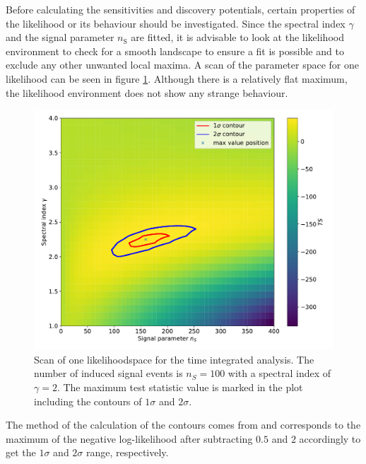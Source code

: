 Before calculating the sensitivities and discovery potentials, certain properties of the likelihood or its behaviour should be investigated.
Since the spectral index $\gamma$ and the signal parameter $n_\text{S}$ are fitted, it is advisable to look at the likelihood environment to check for a smooth landscape to ensure a fit is possible and to exclude any other unwanted local maxima.
A scan of the parameter space for one likelihood can be seen in figure \ref{fig:llh_scan_time_int}.
Although there is a relatively flat maximum, the likelihood environment does not show any strange behaviour.
\begin{figure}
    \centering
    \includegraphics[width=\linewidth]{Plots/05_csky/llh_scan_time_int.pdf}
    \caption{Scan of one likelihoodspace for the time integrated analysis. The number of induced signal events is $n_S = \num{100}$ with a spectral index of $\gamma = 2$. The maximum test statistic value is marked in the plot including the contours of $\num{1}\sigma$ and $\num{2}\sigma$.}
    \label{fig:llh_scan_time_int}
\end{figure}
The method of the calculation of the contours comes from \cite{Blobel} and corresponds to the maximum of the negative log-likelihood after subtracting $\num{0.5}$ and $\num{2}$ accordingly to get the $1\sigma$ and $2\sigma$ range, respectively.

